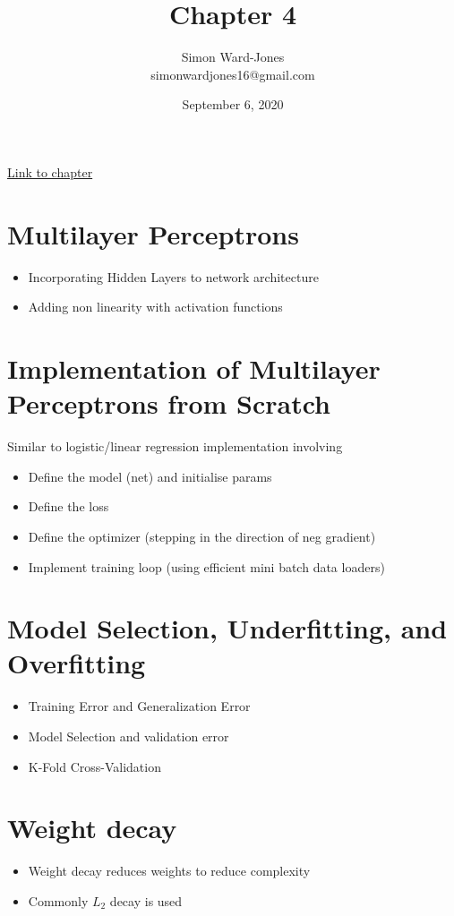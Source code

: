 \documentclass[12pt,notitlepage]{article}
\begin{document}


\title{\Large{\textbf{Chapter 4}}}
\date{September 6, 2020}
\author{Simon Ward-Jones\\simonwardjones16@gmail.com}

\maketitle
\href{https://d2l.ai/chapter_multilayer-perceptrons/index.html}{Link to chapter}

\section{Multilayer Perceptrons}
\begin{itemize}
    \item Incorporating Hidden Layers to network architecture
    \item Adding non linearity with activation functions
\end{itemize}

\section{Implementation of Multilayer Perceptrons from Scratch}
Similar to logistic/linear regression implementation involving
\begin{itemize}
    \item Define the model (net) and initialise params
    \item Define the loss
    \item Define the optimizer (stepping in the direction of neg gradient)
    \item Implement training loop (using efficient mini batch data loaders)
\end{itemize}


\section{Model Selection, Underfitting, and Overfitting}
\begin{itemize}
    \item Training Error and Generalization Error
    \item Model Selection and validation error
    \item K-Fold Cross-Validation
\end{itemize}

\section{Weight decay}
\begin{itemize}
    \item Weight decay reduces weights to reduce complexity
    \item Commonly $L_2$ decay is used 
\end{itemize}
\end{document}
